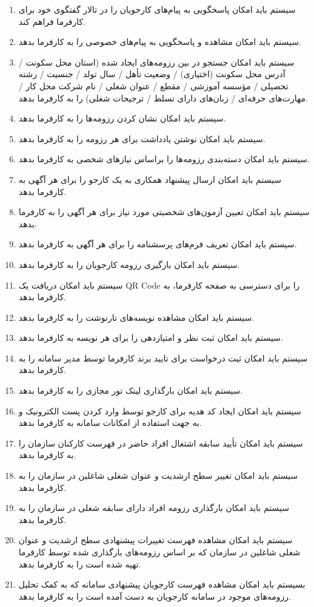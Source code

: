 \documentclass[12pt]{article}
\begin{document}
\begin{itemize}
\begin{enumerate}
			\item سیستم باید امکان پاسخگویی به پیام‌های کارجویان را در تالار گفتگوی خود برای کارفرما فراهم کند.
			\item سیستم باید امکان مشاهده و پاسخگویی به پیام‌های خصوصی را به کارفرما بدهد.
			\item سیستم باید امکان جستجو در بین رزومه‌های ایجاد شده (استان محل سکونت / آدرس محل سکونت (اختیاری) / وضعیت تأهل / سال تولد / جنسیت /  رشته تحصیلی / مؤسسه آموزشی / مقطع / عنوان شغلی / نام شرکت محل کار / مهارت‌های حرفه‌ای / زبان‌های دارای تسلط / ترجیحات شغلی) را به کارفرما بدهد.
			\item سیستم باید امکان نشان کردن رزومه‌ها را به کارفرما بدهد.
			\item سیستم باید امکان نوشتن یادداشت برای هر رزومه را به کارفرما بدهد.
			\item سیستم باید امکان دسته‌بندی رزومه‌ها را براساس نیازهای شخصی به کارفرما بدهد.
			\item سیستم باید امکان ارسال پیشنهاد همکاری به یک کارجو را برای هر آگهی به کارفرما بدهد.
			\item سیستم باید امکان تعیین آزمون‌های شخصیتی مورد نیاز برای هر آگهی را به کارفرما بدهد.
			\item سیستم باید امکان تعریف فرم‌های پرسشنامه را برای هر آگهی به کارفرما بدهد.
			\item سیستم باید امکان بارگیری رزومه کارجویان را به کارفرما بدهد.
			\item سیستم باید امکان دریافت یک QR Code را برای دسترسی به صفحه کارفرما، به کارفرما بدهد.
			\item سیستم باید امکان مشاهده نویسه‌های تارنوشت را به کارفرما بدهد.
			\item سیستم باید امکان ثبت نظر و امتیازدهی را برای هر نویسه به کارفرما بدهد.
			\item سیستم باید امکان ثبت درخواست برای تایید برند کارفرما توسط مدیر سامانه را به کارفرما بدهد.
			\item سیستم باید امکان بارگذاری لینک تور مجازی را به کارفرما بدهد.
			\item سیستم باید امکان ایجاد کد هدیه برای کارجو توسط وارد کردن پست الکترونیک و به جهت استفاده از امکانات سامانه به کارفرما بدهد.
			\item سیستم باید امکان تأیید سابقه اشتغال افراد حاضر در فهرست کارکنان سازمان را به کارفرما بدهد.
			\item سیستم باید امکان تغییر سطح ارشدیت و عنوان شغلی شاغلین در سازمان را به کارفرما بدهد.
			\item سیستم باید امکان بارگذاری رزومه افراد دارای سابقه شغلی در سازمان را به کارفرما بدهد.
			\item سیستم باید امکان مشاهده فهرست تغییرات پیشنهادی سطح ارشدیت و عنوان شغلی شاغلین در سازمان که بر اساس رزومه‌های بارگذاری شده توسط کارفرما تهیه شده است را به کارفرما بدهد.
			\item بسیستم باید امکان مشاهده فهرست کارجویان پیشنهادی سامانه که به کمک تحلیل رزومه‌های موجود در سامانه کارجویان به دست آمده است را به کارفرما بدهد.
		\end{enumerate}
	\end{itemize}
\end{document}
